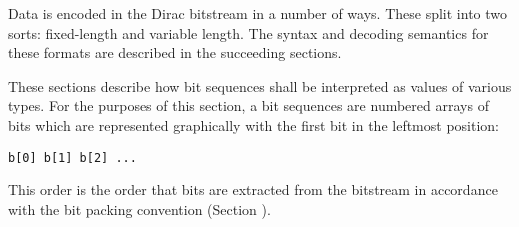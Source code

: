 Data is encoded in the Dirac bitstream in a number of ways. These split
into two sorts: fixed-length and variable length. The syntax and
decoding semantics for these formats are described in the succeeding
sections.

These sections describe how bit sequences shall be interpreted as values
of various types. For the purposes of this section, a bit sequences are
numbered arrays of bits which are represented graphically with the first
bit in the leftmost position:

\begin{verbatim}
b[0] b[1] b[2] ...
\end{verbatim}

This order is the order that bits are extracted from the bitstream in
accordance with the bit packing convention (Section ).
